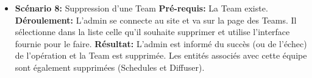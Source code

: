 \documentclass[french]{article}
\begin{document}
\begin{itemize}
		\item \textbf{Scénario 8:} Suppression d'une Team\newline
		\textbf{Pré-requis:} La Team existe.\newline
		\textbf{Déroulement:} L'admin se connecte au site et va sur la page des Teams. Il sélectionne dans la liste celle qu'il souhaite supprimer et utilise l'interface fournie pour le faire. \newline
		\textbf{Résultat:} L'admin est informé du succès (ou de l'échec) de l'opération et la Team est supprimée. Les entités associés avec cette équipe sont également supprimées (Schedules et Diffuser). \newline

					
		\end{itemize}
		\newpage
	 
\end{document}
